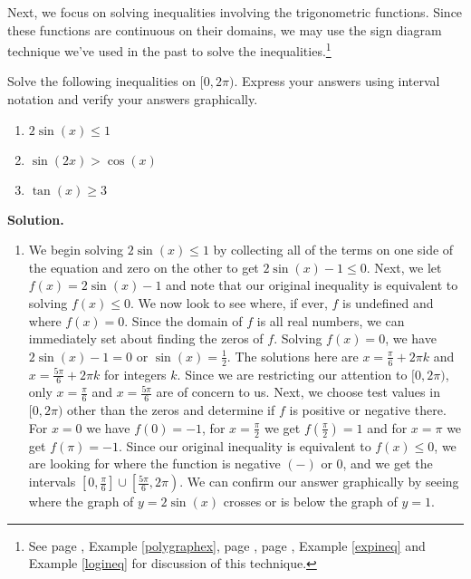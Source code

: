 Next, we focus on solving inequalities involving the trigonometric functions.  Since these functions are continuous on their domains, we may use the sign diagram technique we've used in the past to solve the inequalities.\footnote{See page \pageref{firstsigndiagram}, Example \ref{polygraphex}, page \pageref{rationalsigndiagram}, page \pageref{algebraicsigndiagram}, Example \ref{expineq} and Example \ref{logineq} for discussion of this technique.}

\begin{ex}  \label{TrigIneqEx1} Solve the following inequalities on $[0,2\pi)$.  Express your answers using interval notation and verify your answers graphically.

\begin{multicols}{3}

\begin{enumerate}

\item  $2\sin(x) \leq 1$

\item  $\sin(2x) > \cos(x)$

\item  $\tan(x) \geq 3$

\end{enumerate}

\end{multicols}

{\bf Solution.}

\begin{enumerate}

\item  We begin solving $2\sin(x) \leq 1$ by collecting all of the terms on one side of the equation and zero on the other to get $2\sin(x) - 1 \leq 0$.  Next, we let $f(x) = 2\sin(x) - 1$ and note that our original inequality is equivalent to solving $f(x) \leq 0$. We now look to see where, if ever, $f$ is undefined and where $f(x) = 0$.  Since the domain of $f$ is all real numbers, we can immediately set  about finding the zeros of $f$.  Solving $f(x) = 0$, we have $2\sin(x) - 1=0$ or $\sin(x) = \frac{1}{2}$.  The solutions here are $x = \frac{\pi}{6} + 2\pi k$ and $x = \frac{5\pi}{6} + 2\pi k$ for integers $k$.  Since we are restricting our attention to $[0,2\pi)$, only $x = \frac{\pi}{6}$ and $x = \frac{5\pi}{6}$ are of concern to us.  Next, we choose test values in $[0,2\pi)$ other than the zeros and determine if $f$ is positive or negative there.  For $x = 0$ we have $f(0) = -1$, for $x = \frac{\pi}{2}$ we get $f\left(\frac{\pi}{2}\right) = 1$ and for $x = \pi$ we get $f(\pi) = -1$.  Since our original inequality is equivalent to $f(x) \leq 0$, we are looking for where the function is negative $(-)$ or $0$, and we get the intervals $\left[0, \frac{\pi}{6}\right] \cup \left[\frac{5\pi}{6}, 2\pi \right)$.  We can confirm our answer graphically by seeing where the graph of $y = 2\sin(x)$ crosses or is below the graph of $y = 1$. 


\end{enumerate}
\end{ex}
